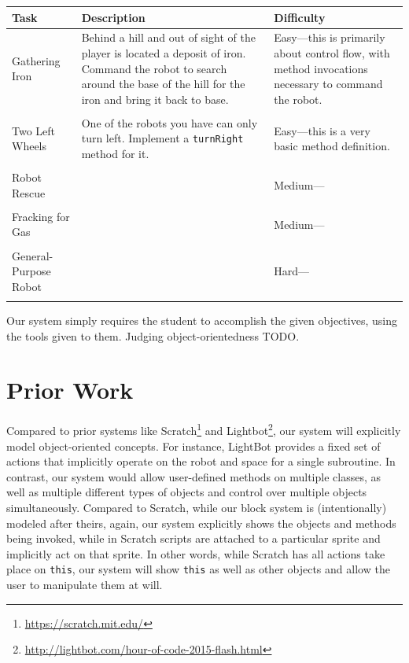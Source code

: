 \documentclass[12pt,notitlepage]{article}
\begin{document}
\noindent\begin{tabu}{lXX}
  \\
\toprule
Task & Description & Difficulty \\
\midrule
Gathering Iron & Behind a hill and out of sight of the player is
located a deposit of iron. Command the robot to search around the base
of the hill for the iron and bring it back to base.& Easy---this is
primarily about control flow, with method invocations necessary to
command the robot. \\
\\
Two Left Wheels & One of the robots you have can only turn
left. Implement a \texttt{turnRight} method for it. & Easy---this is a
very basic method definition.\\ \\
Robot Rescue & & Medium--- \\ \\
Fracking for Gas & & Medium--- \\ \\
General-Purpose Robot & & Hard--- \\
\bottomrule
\\
\end{tabu}
Our system simply requires the student to accomplish the given
objectives, using the tools given to them. Judging object-orientedness
TODO.

\section{Prior Work}

Compared to prior systems like
Scratch\footnote{\url{https://scratch.mit.edu/}} and
Lightbot\footnote{\url{http://lightbot.com/hour-of-code-2015-flash.html}},
our system will explicitly model object-oriented concepts. For
instance, LightBot provides a fixed set of actions that implicitly
operate on the robot and space for a single subroutine. In contrast,
our system would allow user-defined methods on multiple classes, as
well as multiple different types of objects and control over multiple
objects simultaneously. Compared to Scratch, while our block system is
(intentionally) modeled after theirs, again, our system explicitly
shows the objects and methods being invoked, while in Scratch scripts
are attached to a particular sprite and implicitly act on that
sprite. In other words, while Scratch has all actions take place on
\texttt{this}, our system will show \texttt{this} as well as other
objects and allow the user to manipulate them at will.
\end{document}
